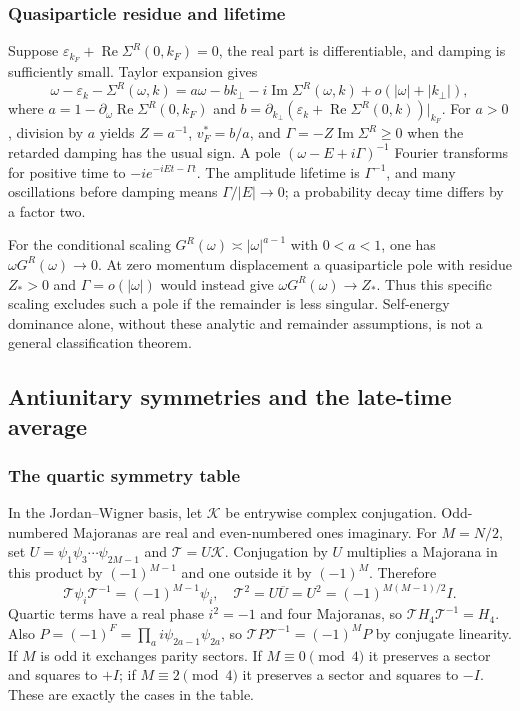 \documentclass[11pt]{article}
\numberwithin{equation}{section}
\theoremstyle{exposition}
\theoremstyle{result}
\begin{document}
\subsubsection{Quasiparticle residue and lifetime}
Suppose $\varepsilon_{k_F}+\operatorname{Re}\Sigma^R(0,k_F)=0$, the real part is differentiable, and damping is sufficiently small. Taylor expansion gives
\begin{equation*}
\omega-\varepsilon_k-\Sigma^R(\omega,k)
=a\omega-bk_\perp-i\operatorname{Im}\Sigma^R(\omega,k)+o(|\omega|+|k_\perp|),
\end{equation*}
where $a=1-\partial_\omega\operatorname{Re}\Sigma^R(0,k_F)$ and $b=\partial_{k_\perp}(\varepsilon_k+\operatorname{Re}\Sigma^R(0,k))|_{k_F}$. For $a>0$, division by $a$ yields $Z=a^{-1}$, $v_F^*=b/a$, and $\Gamma=-Z\operatorname{Im}\Sigma^R\geq0$ when the retarded damping has the usual sign. A pole $(\omega-E+i\Gamma)^{-1}$ Fourier transforms for positive time to $-ie^{-iEt-\Gamma t}$. The amplitude lifetime is $\Gamma^{-1}$, and many oscillations before damping means $\Gamma/|E|\to0$; a probability decay time differs by a factor two.

For the conditional scaling $G^R(\omega)\asymp|\omega|^{a-1}$ with $0<a<1$, one has $\omega G^R(\omega)\to0$. At zero momentum displacement a quasiparticle pole with residue $Z_*>0$ and $\Gamma=o(|\omega|)$ would instead give $\omega G^R(\omega)\to Z_*$. Thus this specific scaling excludes such a pole if the remainder is less singular. Self-energy dominance alone, without these analytic and remainder assumptions, is not a general classification theorem.

\subsection{Antiunitary symmetries and the late-time average}\label{app:symmetryDetails}

\subsubsection{The quartic symmetry table}
In the Jordan--Wigner basis, let $\mathcal K$ be entrywise complex conjugation. Odd-numbered Majoranas are real and even-numbered ones imaginary. For $M=N/2$, set $U=\psi_1\psi_3\cdots\psi_{2M-1}$ and $\mathcal T=U\mathcal K$. Conjugation by $U$ multiplies a Majorana in this product by $(-1)^{M-1}$ and one outside it by $(-1)^M$. Therefore
\begin{equation*}
\mathcal T\psi_i\mathcal T^{-1}=(-1)^{M-1}\psi_i,\quad
\mathcal T^2=U\overline U=U^2=(-1)^{M(M-1)/2}I.
\end{equation*}
Quartic terms have a real phase $i^2=-1$ and four Majoranas, so $\mathcal TH_4\mathcal T^{-1}=H_4$. Also $P=(-1)^F=\prod_a i\psi_{2a-1}\psi_{2a}$, so $\mathcal T P\mathcal T^{-1}=(-1)^MP$ by conjugate linearity. If $M$ is odd it exchanges parity sectors. If $M\equiv0\pmod4$ it preserves a sector and squares to $+I$; if $M\equiv2\pmod4$ it preserves a sector and squares to $-I$. These are exactly the cases in the table.
\end{document}
